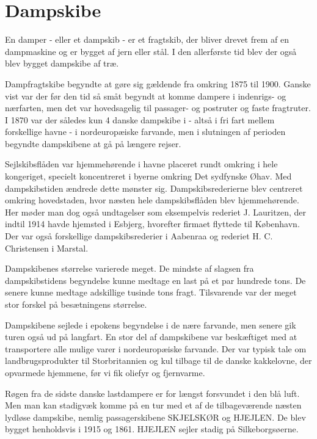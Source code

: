 \part{Dampskibe}\label{part:dampskibe}

En damper - eller et dampskib - er et fragtskib, der bliver drevet frem
af en dampmaskine og er bygget af jern eller stål. I den allerførste tid
blev der også blev bygget dampskibe af træ. 

Dampfragtskibe begyndte at gøre sig gældende fra omkring 1875 til 1900.
Ganske vist var der før den tid så småt begyndt at komme dampere i
indenrigs- og nærfarten, men det var hovedsagelig til passager- og
postruter og faste fragtruter. I 1870 var der således kun 4 danske
dampskibe i  - altså i fri
fart mellem forskellige havne - i nordeuropæiske farvande, men i
slutningen af perioden begyndte dampskibene at gå på længere rejser.

Sejlskibsflåden var hjemmehørende i havne placeret rundt omkring i hele
kongeriget, specielt koncentreret i byerne omkring Det sydfynske Øhav.
Med dampskibstiden ændrede dette mønster sig. Dampskibsrederierne blev
centreret omkring hovedstaden, hvor næsten hele dampskibsflåden blev
hjemmehørende. Her møder man dog også undtagelser som eksempelvis
rederiet J. Lauritzen, der indtil 1914 havde hjemsted i Esbjerg,
hvorefter firmaet flyttede til København. Der var også forskellige
dampskibsrederier i Aabenraa og rederiet H. C. Christensen i Marstal.

Dampskibenes størrelse varierede meget. De mindste af slagsen fra
dampskibstidens begyndelse kunne medtage en last på et par hundrede tons.
De senere kunne medtage adskillige tusinde tons fragt. Tilsvarende var
der meget stor forskel på besætningens størrelse. 

Dampskibene sejlede i epokens begyndelse i de nære farvande, men senere
gik turen også ud på langfart. En stor del af dampskibene var beskæftiget
med at transportere alle mulige varer i nordeuropæiske farvande. Der var
typisk tale om landbrugsprodukter til Storbritannien og kul tilbage til
de danske kakkelovne, der opvarmede hjemmene, før vi fik oliefyr og
fjernvarme. 

Røgen fra de sidste danske lastdampere er for længst forsvundet i den blå
luft. Men man kan stadigvæk komme på en tur med et af de tilbageværende
næsten lydløse dampskibe, nemlig passagerskibene SKJELSKØR og HJEJLEN. De
blev bygget henholdsvis i 1915 og 1861. HJEJLEN sejler stadig på
Silkeborgsøerne.
